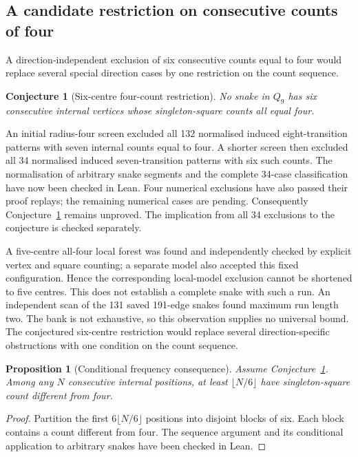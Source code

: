 \documentclass[11pt,a4paper]{article}
\newtheorem{proposition}[theorem]{Proposition}
\newtheorem{conjecture}[theorem]{Conjecture}
\theoremstyle{definition}
\theoremstyle{remark}
\newcommand{\Q}{Q}
\begin{document}
\subsection{A candidate restriction on consecutive counts of four}\label{sec:four-run}
A direction-independent exclusion of six consecutive counts equal to four would replace several special direction cases by one restriction on the count sequence.
\begin{conjecture}[Six-centre four-count restriction]\label{conj:six-fours}
No snake in $\Q_9$ has six consecutive internal vertices whose singleton-square counts all equal four.
\end{conjecture}
An initial radius-four screen excluded all 132 normalised induced eight-transition patterns with seven internal counts equal to four. A shorter screen then excluded all 34 normalised induced seven-transition patterns with six such counts. The normalisation of arbitrary snake segments and the complete 34-case classification have now been checked in Lean. Four numerical exclusions have also passed their proof replays; the remaining numerical cases are pending. Consequently Conjecture~\ref{conj:six-fours} remains unproved. The implication from all 34 exclusions to the conjecture is checked separately.

A five-centre all-four local forest was found and independently checked by explicit vertex and square counting; a separate model also accepted this fixed configuration. Hence the corresponding local-model exclusion cannot be shortened to five centres. This does not establish a complete snake with such a run. An independent scan of the 131 saved 191-edge snakes found maximum run length two. The bank is not exhaustive, so this observation supplies no universal bound. The conjectured six-centre restriction would replace several direction-specific obstructions with one condition on the count sequence.

\begin{proposition}[Conditional frequency consequence]
Assume Conjecture~\ref{conj:six-fours}. Among any $N$ consecutive internal positions, at least $\lfloor N/6\rfloor$ have singleton-square count different from four.
\end{proposition}
\begin{proof}
Partition the first $6\lfloor N/6\rfloor$ positions into disjoint blocks of six. Each block contains a count different from four. The sequence argument and its conditional application to arbitrary snakes have been checked in Lean.
\end{proof}
\end{document}
